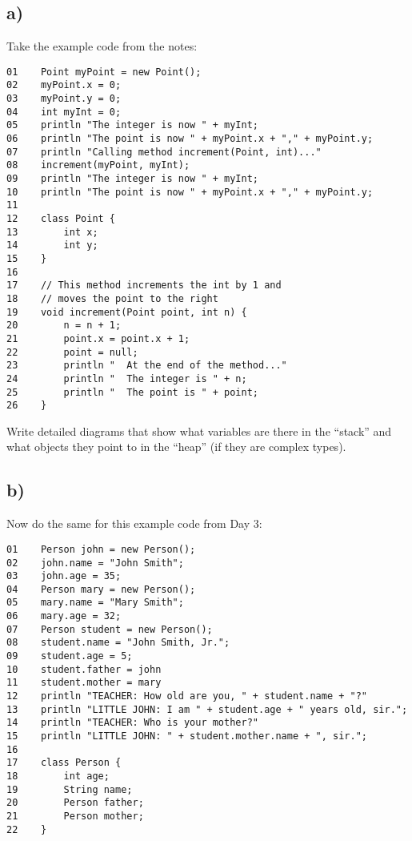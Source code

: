 \documentclass{article}
\begin{document}
\subsection{a)}

Take the example code from the notes:  

\begin{verbatim}
01    Point myPoint = new Point();
02    myPoint.x = 0;
03    myPoint.y = 0;
04    int myInt = 0;
05    println "The integer is now " + myInt;
06    println "The point is now " + myPoint.x + "," + myPoint.y;
07    println "Calling method increment(Point, int)..."
08    increment(myPoint, myInt);
09    println "The integer is now " + myInt;
10    println "The point is now " + myPoint.x + "," + myPoint.y;
11
12    class Point {
13        int x;
14        int y;
15    }
16
17    // This method increments the int by 1 and 
18    // moves the point to the right
19    void increment(Point point, int n) {
20        n = n + 1;
21        point.x = point.x + 1;
22        point = null;
23        println "  At the end of the method..."
24        println "  The integer is " + n;
25        println "  The point is " + point;
26    }
\end{verbatim}

Write detailed diagrams that show what variables are there in the
``stack'' and what objects they point to in the ``heap'' (if they are
complex types). 

\subsection{b)}
\label{sec:bff}

Now do the same for this example code from Day 3:

\begin{verbatim}
01    Person john = new Person();
02    john.name = "John Smith";
03    john.age = 35;
04    Person mary = new Person();
05    mary.name = "Mary Smith";
06    mary.age = 32;
07    Person student = new Person();
08    student.name = "John Smith, Jr.";
09    student.age = 5;
10    student.father = john
11    student.mother = mary
12    println "TEACHER: How old are you, " + student.name + "?"
13    println "LITTLE JOHN: I am " + student.age + " years old, sir.";
14    println "TEACHER: Who is your mother?"
15    println "LITTLE JOHN: " + student.mother.name + ", sir.";
16
17    class Person {
18        int age;
19        String name;
20        Person father;
21        Person mother;
22    }
\end{verbatim}
\end{document}
